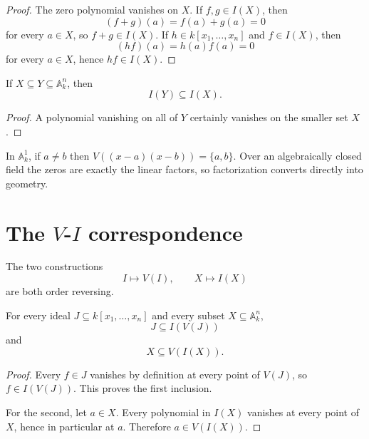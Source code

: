 \begin{proof}
The zero polynomial vanishes on \(X\).  If \(f,g\in I(X)\), then
\[
  (f+g)(a)=f(a)+g(a)=0
\]
for every \(a\in X\), so \(f+g\in I(X)\).  If \(h\in k[x_1,\dots,x_n]\) and
\(f\in I(X)\), then
\[
  (hf)(a)=h(a)f(a)=0
\]
for every \(a\in X\), hence \(hf\in I(X)\).
\end{proof}

\begin{proposition}
\label{prop:vi01-order-reversal-I}
If \(X\subseteq Y\subseteq\mathbb A_k^n\), then
\[
  I(Y)\subseteq I(X).
\]
\end{proposition}

\begin{proof}
A polynomial vanishing on all of \(Y\) certainly vanishes on the smaller set \(X\).
\end{proof}

\begin{example}\label{ex:vi01-expand-02}
In $\mathbb A^1_k$, if $a\ne b$ then $V((x-a)(x-b))=\{a,b\}$.  Over an algebraically closed field the zeros are exactly the linear factors, so factorization converts directly into geometry.
\end{example}
\section{The \(V\)-\(I\) correspondence}
\label{sec:vi01-VI-correspondence}

The two constructions
\[
  I\longmapsto V(I),
  \qquad
  X\longmapsto I(X)
\]
are both order reversing.

\begin{proposition}
\label{prop:vi01-closure-inequalities}
For every ideal \(J\subseteq k[x_1,\dots,x_n]\) and every subset
\(X\subseteq\mathbb A_k^n\),
\[
  J\subseteq I(V(J))
\]
and
\[
  X\subseteq V(I(X)).
\]
\end{proposition}

\begin{proof}
Every \(f\in J\) vanishes by definition at every point of \(V(J)\), so
\(f\in I(V(J))\).  This proves the first inclusion.

For the second, let \(a\in X\).  Every polynomial in \(I(X)\) vanishes at every point of
\(X\), hence in particular at \(a\).  Therefore \(a\in V(I(X))\).
\end{proof}

